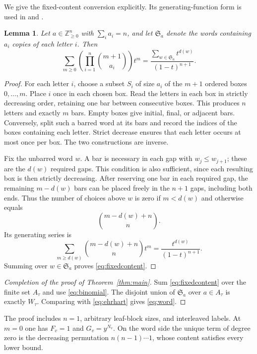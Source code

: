\documentclass[11pt]{article}
\newtheorem{lemma}[theorem]{Lemma}
\newcommand{\N}{\mathbb Z_{\geq0}}
\begin{document}
We give the fixed-content conversion explicitly. Its generating-function
form is used in \cite[Section~4]{AXY} and \cite[Remark~7.3]{AC}.

\begin{lemma}\label{lem:words}
Let $a\in\N^n$ with $\sum_i a_i=n$, and let $\mathfrak S_a$ denote the
words containing $a_i$ copies of each letter $i$. Then
\begin{equation}\label{eq:fixedcontent}
 \sum_{m\geq0}\left(\prod_{i=1}^n\binom{m+1}{a_i}\right)t^m
     =\frac{\sum_{w\in\mathfrak S_a}t^{d(w)}}{(1-t)^{n+1}}.
\end{equation}
\end{lemma}

\begin{proof}
For each letter $i$, choose a subset $S_i$ of size $a_i$ of the $m+1$
ordered boxes $0,\ldots,m$. Place $i$ once in each chosen box. Read the
letters in each box in strictly decreasing order, retaining one bar between
consecutive boxes. This produces $n$ letters and exactly $m$ bars.
Empty boxes give initial, final, or adjacent bars. Conversely, split such
a barred word at its bars and record the indices of the boxes containing
each letter. Strict decrease ensures that each letter occurs at most once
per box. The two constructions are inverse.

Fix the unbarred word $w$. A bar is necessary in each gap with
$w_j\leq w_{j+1}$; these are the $d(w)$ required gaps. This condition
is also sufficient, since each resulting box is then strictly decreasing.
After reserving one bar in each required gap, the remaining $m-d(w)$
bars can be placed freely in the $n+1$ gaps, including both ends. Thus
the number of choices above $w$ is zero if $m<d(w)$ and otherwise equals
\[
 \binom{m-d(w)+n}{n}.
\]
Its generating series is
\[
 \sum_{m\geq d(w)}\binom{m-d(w)+n}{n}t^m
       =\frac{t^{d(w)}}{(1-t)^{n+1}}.
\]
Summing over $w\in\mathfrak S_a$ proves \eqref{eq:fixedcontent}.
\end{proof}

\begin{proof}[Completion of the proof of Theorem~\ref{thm:main}]
Sum \eqref{eq:fixedcontent} over the finite set $A_\tau$ and use
\eqref{eq:binomial}. The disjoint union of $\mathfrak S_a$ over
$a\in A_\tau$ is exactly $W_\tau$. Comparing with \eqref{eq:ehrhart}
gives \eqref{eq:word}.
\end{proof}

The proof includes $n=1$, arbitrary leaf-block sizes, and interleaved
labels. At $m=0$ one has $F_v=1$ and $G_v=y^{N_v}$. On the word side
the unique term of degree zero is the decreasing permutation
$n(n-1)\cdots1$, whose content satisfies every lower bound.
\end{document}
